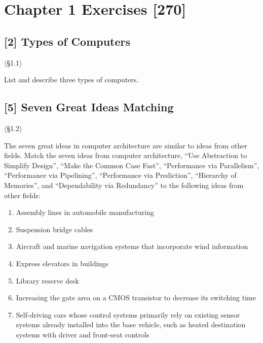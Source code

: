 \section{Chapter 1 Exercises [270]}

\subsection{[2] Types of Computers}
\hypertarget{prob-1.1}{}
\noindent$\langle$\S1.1$\rangle$\medskip

\noindent List and describe three types of computers.

\problembreak %

\subsection{[5] Seven Great Ideas Matching}
\hypertarget{prob-1.2}{}
\noindent$\langle$\S1.2$\rangle$\medskip

\noindent The seven great ideas in computer architecture are similar to ideas from other
fields. Match the seven ideas from computer architecture, ``Use Abstraction to
Simplify Design'', ``Make the Common Case Fast'', ``Performance via
Parallelism'', ``Performance via Pipelining'', ``Performance via Prediction'',
``Hierarchy of Memories'', and ``Dependability via Redundancy'' to the
following ideas from other fields:

\begin{enumerate}
  \item[a.] Assembly lines in automobile manufacturing
  \item[b.] Suspension bridge cables
  \item[c.] Aircraft and marine navigation systems that incorporate wind
        information
  \item[d.] Express elevators in buildings
  \item[e.] Library reserve desk
  \item[f.] Increasing the gate area on a CMOS transistor to decrease its
        switching time
  \item[g.] Self-driving cars whose control systems primarily rely on
        existing sensor systems already installed into the base vehicle,
        such as heated destination systems with driver and front-seat controls
\end{enumerate}

